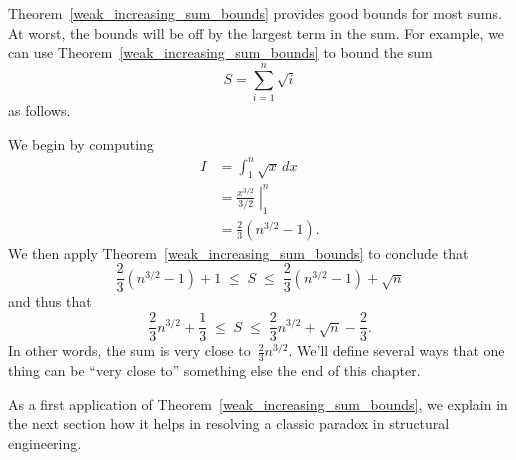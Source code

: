 Theorem~\ref{weak_increasing_sum_bounds} provides good bounds for most sums.  At worst,
the bounds will be off by the largest term in the sum.  For example,
we can use Theorem~\ref{weak_increasing_sum_bounds} to bound the sum
\[
    S = \sum_{i = 1}^n \sqrt{i}
\]
as follows.

We begin by computing
\begin{align*}
    I   &= \int_1^n \sqrt{x} \, dx \\
        &= \left. \frac{x^{3/2}}{3/2} \; \right|_1^n \\
        &= \frac{2}{3} (n^{3/2} - 1).
\end{align*}
We then apply Theorem~\ref{weak_increasing_sum_bounds} to conclude that
\[
    \frac{2}{3} (n^{3/2} - 1) + 1
    \; \le \; S
    \; \le \; \frac{2}{3} (n^{3/2} - 1) + \sqrt{n}
\]
and thus that
\[
    \frac{2}{3} n^{3/2} + \frac{1}{3}
    \; \le \; S
    \; \le \; \frac{2}{3} n^{3/2} + \sqrt{n} - \frac{2}{3}.
\]
In other words, the sum is very close to~$\frac{2}{3} n^{3/2}$.  We'll
define several ways that one thing can be ``very close to'' something
else the end of this chapter.

As a first application of Theorem~\ref{weak_increasing_sum_bounds}, we
explain in the next section how it helps in resolving a classic
paradox in structural engineering.

\begin{problems}
\practiceproblems
{}

\classproblems
{}

\examproblems
{}

\homeworkproblems
{}

\end{problems}


